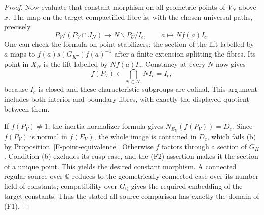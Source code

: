 \begin{proof}
Now evaluate that constant morphism on all geometric points
of $V_N$ above $x$. The map on the target compactified fibre
is, with the chosen universal paths, precisely
\[
 P_V/(P_V\cap J_N)\longrightarrow N\backslash P_U/I_c,
       \qquad a\longmapsto N f(a)I_c.
\]
One can check the formula on point stabilizers: the section
of the lift labelled by $a$ maps to
$f(a)s(G_{K''})f(a)^{-1}$ after a finite extension splitting
the fibres. Its point in $X_N$ is the lift labelled by
$Nf(a)I_c$. Constancy at every $N$ now gives
\[
 f(P_V)\subset\bigcap_{N\subset N_0}N I_c=I_c,
\]
because $I_c$ is closed and these characteristic subgroups
are cofinal. This argument includes both interior and boundary
fibres, with exactly the displayed quotient between them.

If $f(P_V)\ne1$, the inertia normalizer formula gives
$N_{E_U}(f(P_V))=D_c$. Since $f(P_V)$ is normal in $f(E_V)$,
the whole image is contained in $D_c$, which fails (b) by
Proposition~\ref{F-point-equivalence}. Otherwise $f$ factors
through a section of $G_K$. Condition (b) excludes its cusp
case, and the (F2) assertion makes it the section of a unique
point. This yields the desired constant morphism. A connected
regular source over $\mathbb Q$ reduces to the geometrically
connected case over its number field of constants; compatibility
over $G_{\mathbb Q}$ gives the required embedding of the
target constants. Thus the stated all-source comparison has
exactly the domain of (F1).
\end{proof}


